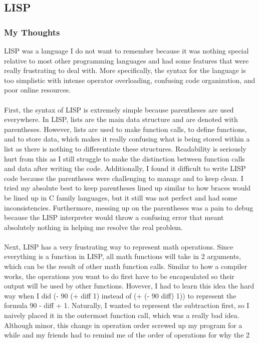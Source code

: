 \documentclass[letterpaper, 10pt, DIV=13]{scrartcl}
\numberwithin{equation}{section}
\numberwithin{figure}{section}
\numberwithin{table}{section}
\begin{document}
\subsection{LISP}
\subsubsection{My Thoughts}
LISP was a language I do not want to remember because it was nothing special relative to most other programming languages and had some features 
that were really frustrating to deal with. More specifically, the syntax for the language is too simplistic with intense operator overloading, 
confusing code organization, and poor online resources.
\\ \\
First, the syntax of LISP is extremely simple because parentheses are used everywhere. In LISP, lists are the main data structure and are denoted with 
parentheses. However, lists are used to make function calls, to define functions, and to store data, which makes it really confusing what is being stored within a 
list as there is nothing to differentiate these structures. Readability is seriously hurt from this as I still struggle to make the distinction between function 
calls and data after writing the code. Additionally, I found it difficult to write LISP code because the parentheses were challenging to manage and to keep clean. 
I tried my absolute best to keep parentheses lined up similar to how braces would be lined up in C family languages, but it still was not perfect and had some 
inconsistencies. Furthermore, messing up on the parentheses was a pain to debug because the LISP interpreter would throw a confusing error that meant absolutely 
nothing in helping me resolve the real problem.
\\ \\
Next, LISP has a very frustrating way to represent math operations. Since everything is a function in LISP, all math functions will take in 2 arguments, which 
can be the result of other math function calls. Similar to how a compiler works, the operations you want to do first have to be encapsulated so their output 
will be used by other functions. Hovever, I had to learn this idea the hard way when I did (- 90 (+ diff 1) instead of (+ (- 90 diff) 1)) to represent the formula
90 - diff + 1. Naturally, I wanted to represent the subtraction first, so I naively placed it in the outermost function call, which was a really bad idea.
Although minor, this change in operation order screwed up my program for a while and my friends had to remind me of the order of operations for why the 2 
\end{document}
